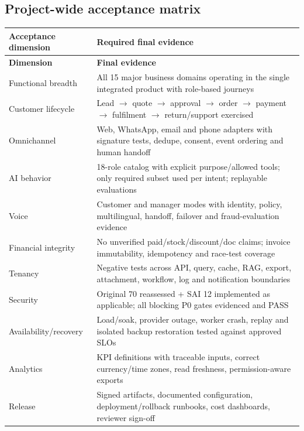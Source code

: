 \documentclass[10.5pt,a4paper,oneside]{article}
\begin{document}
\subsection{Project-wide acceptance matrix}
\small
\begin{longtable}{@{}L{43mm}L{119mm}@{}}
\toprule{}\textbf{Acceptance dimension} & \textbf{Required final evidence}\\\midrule
\endfirsthead\toprule{}\textbf{Dimension} & \textbf{Final evidence}\\\midrule\endhead
Functional breadth & All 15 major business domains operating in the single integrated product with role-based journeys\\
Customer lifecycle & Lead $\rightarrow$ quote $\rightarrow$ approval $\rightarrow$ order $\rightarrow$ payment $\rightarrow$ fulfilment $\rightarrow$ return/support exercised\\
Omnichannel & Web, WhatsApp, email and phone adapters with signature tests, dedupe, consent, event ordering and human handoff\\
AI behavior & 18-role catalog with explicit purpose/allowed tools; only required subset used per intent; replayable evaluations\\
Voice & Customer and manager modes with identity, policy, multilingual, handoff, failover and fraud-evaluation evidence\\
Financial integrity & No unverified paid/stock/discount/doc claims; invoice immutability, idempotency and race-test coverage\\
Tenancy & Negative tests across API, query, cache, RAG, export, attachment, workflow, log and notification boundaries\\
Security & Original 70 reassessed + SAI 12 implemented as applicable; all blocking P0 gates evidenced and PASS\\
Availability/recovery & Load/soak, provider outage, worker crash, replay and isolated backup restoration tested against approved SLOs\\
Analytics & KPI definitions with traceable inputs, correct currency/time zones, read freshness, permission-aware exports\\
Release & Signed artifacts, documented configuration, deployment/rollback runbooks, cost dashboards, reviewer sign-off\\
\bottomrule\end{longtable}\normalsize
\end{document}
